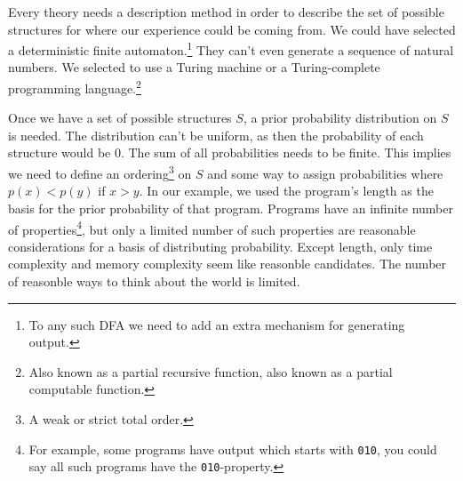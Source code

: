 Every theory needs a description method in order to describe the set of possible structures for where our experience could be coming from.
We could have selected a deterministic finite automaton.\footnote{To any such DFA we need to add an extra mechanism for generating output.}
They can't even generate a sequence of natural numbers.
We selected to use a Turing machine or a Turing-complete programming language.\footnote{Also known as a partial recursive function, also known as a partial computable function.}

Once we have a set of possible structures $S$, a prior probability distribution on $S$ is needed.
The distribution can't be uniform, as then the probability of each structure would be 0.
The sum of all probabilities needs to be finite.
This implies we need to define an ordering\footnote{A weak or strict total order.} on $S$ and some way to assign probabilities where $p(x) < p(y)$ if $x > y$.
In our example, we used the program's length as the basis for the prior probability of that program.
Programs have an infinite number of properties\footnote{For example, some programs have output which starts with \texttt{010}, you could say all such programs have the \texttt{010}-property.}, but only a limited number of such properties are reasonable considerations for a basis of distributing probability.
Except length, only time complexity and memory complexity seem like reasonble candidates.
The number of reasonble ways to think about the world is limited.

\newpage

\begin{figure}[h]
	\centering
{}
\end{figure}

